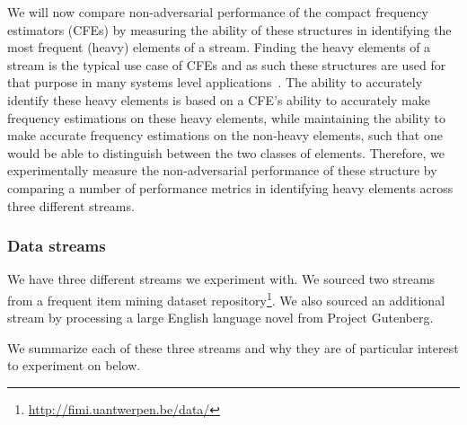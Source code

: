 %
We will now compare non-adversarial performance of the compact frequency estimators (CFEs) by measuring the ability of these structures in identifying the most frequent (heavy) elements of a stream. Finding the heavy elements of a stream is the typical use case of CFEs and as such these structures are used for that purpose in many systems level applications~\cite{yang2019heavykeeper,mandal2018topkapi,radu2010,metwally2006,cormode2005improved,charikar2002finding,manku2002approximate}. The ability to accurately identify these heavy elements is based on a CFE's ability to accurately make frequency estimations on these heavy elements, while maintaining the ability to make accurate frequency estimations on the non-heavy elements, such that one would be able to distinguish between the two classes of elements. Therefore, we experimentally measure the non-adversarial performance of these structure by comparing a number of performance metrics in identifying heavy elements across three different streams. 

\subsubsection{Data streams} We have three different streams we experiment with. We sourced two streams from a frequent item mining dataset repository\footnote{\url{http://fimi.uantwerpen.be/data/}}. We also sourced an additional stream by processing a large English language novel from Project Gutenberg. %

We summarize each of these three streams and why they are of particular interest to experiment on below.

